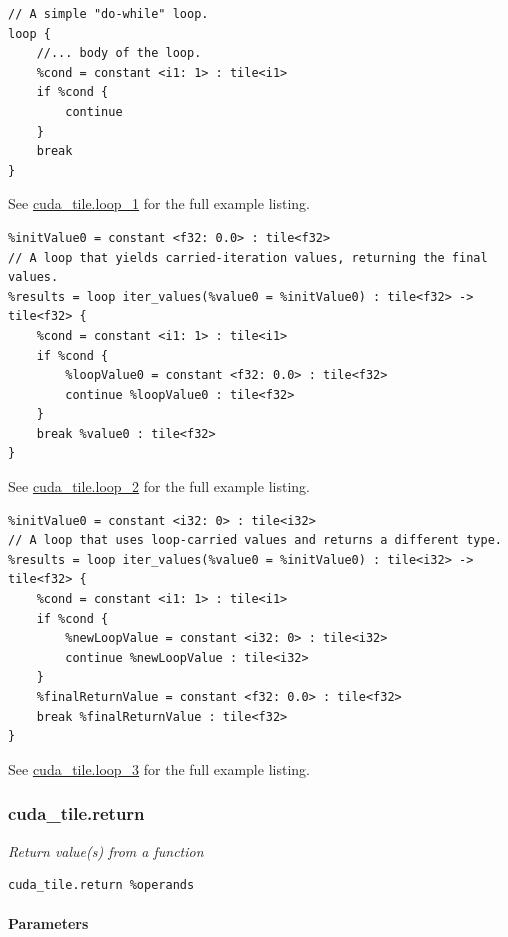 \documentclass{article}
\begin{document}
\begin{lstlisting}
// A simple "do-while" loop.
loop {
    //... body of the loop.
    %cond = constant <i1: 1> : tile<i1>
    if %cond {
        continue
    }
    break
}
\end{lstlisting}

See \href{https://docs.nvidia.com/cuda/tile-ir/latest/sections/appendix.html#example-cuda-tile-loop-1}{cuda\_tile.loop\_1} for the full example listing.


\begin{lstlisting}
%initValue0 = constant <f32: 0.0> : tile<f32>
// A loop that yields carried-iteration values, returning the final values.
%results = loop iter_values(%value0 = %initValue0) : tile<f32> -> tile<f32> {
    %cond = constant <i1: 1> : tile<i1>
    if %cond {
        %loopValue0 = constant <f32: 0.0> : tile<f32>
        continue %loopValue0 : tile<f32>
    }
    break %value0 : tile<f32>
}
\end{lstlisting}

See \href{https://docs.nvidia.com/cuda/tile-ir/latest/sections/appendix.html#example-cuda-tile-loop-2}{cuda\_tile.loop\_2} for the full example listing.


\begin{lstlisting}
%initValue0 = constant <i32: 0> : tile<i32>
// A loop that uses loop-carried values and returns a different type.
%results = loop iter_values(%value0 = %initValue0) : tile<i32> -> tile<f32> {
    %cond = constant <i1: 1> : tile<i1>
    if %cond {
        %newLoopValue = constant <i32: 0> : tile<i32>
        continue %newLoopValue : tile<i32>
    }
    %finalReturnValue = constant <f32: 0.0> : tile<f32>
    break %finalReturnValue : tile<f32>
}
\end{lstlisting}

See \href{https://docs.nvidia.com/cuda/tile-ir/latest/sections/appendix.html#example-cuda-tile-loop-3}{cuda\_tile.loop\_3} for the full example listing.



\subsubsection{cuda\_tile.return}

\textit{Return value(s) from a function}


\begin{lstlisting}
cuda_tile.return %operands
\end{lstlisting}

\paragraph{Parameters}
\end{document}
